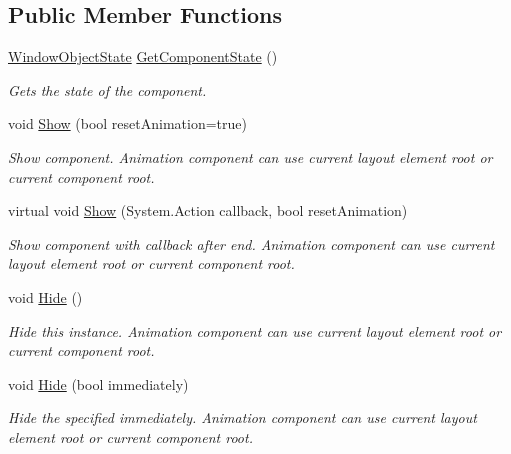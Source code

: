 \subsection*{Public Member Functions}
\begin{DoxyCompactItemize}
\item 
\hyperlink{namespace_unity_engine_1_1_u_i_1_1_windows_aa2b8efef4db5d0280e4019ea89bb63ec}{Window\+Object\+State} \hyperlink{class_unity_engine_1_1_u_i_1_1_windows_1_1_window_component_base_ac3e494a6abb21caa388dbf8823af4922}{Get\+Component\+State} ()
\begin{DoxyCompactList}\small\item\em Gets the state of the component. \end{DoxyCompactList}\item 
void \hyperlink{class_unity_engine_1_1_u_i_1_1_windows_1_1_window_component_base_a4c807a6358efe5f16128c5d815582b24}{Show} (bool reset\+Animation=true)
\begin{DoxyCompactList}\small\item\em Show component. Animation component can use current layout element root or current component root. \end{DoxyCompactList}\item 
virtual void \hyperlink{class_unity_engine_1_1_u_i_1_1_windows_1_1_window_component_base_a0563e6f8ae7642ed5ffb67a49245a067}{Show} (System.\+Action callback, bool reset\+Animation)
\begin{DoxyCompactList}\small\item\em Show component with callback after end. Animation component can use current layout element root or current component root. \end{DoxyCompactList}\item 
void \hyperlink{class_unity_engine_1_1_u_i_1_1_windows_1_1_window_component_base_a877228ed29496ae2429968d45ad873fe}{Hide} ()
\begin{DoxyCompactList}\small\item\em Hide this instance. Animation component can use current layout element root or current component root. \end{DoxyCompactList}\item 
void \hyperlink{class_unity_engine_1_1_u_i_1_1_windows_1_1_window_component_base_a4259551d5f8b98c574224a4c0311f7d3}{Hide} (bool immediately)
\begin{DoxyCompactList}\small\item\em Hide the specified immediately. Animation component can use current layout element root or current component root. \end{DoxyCompactList}\item 

\end{DoxyCompactItemize}
